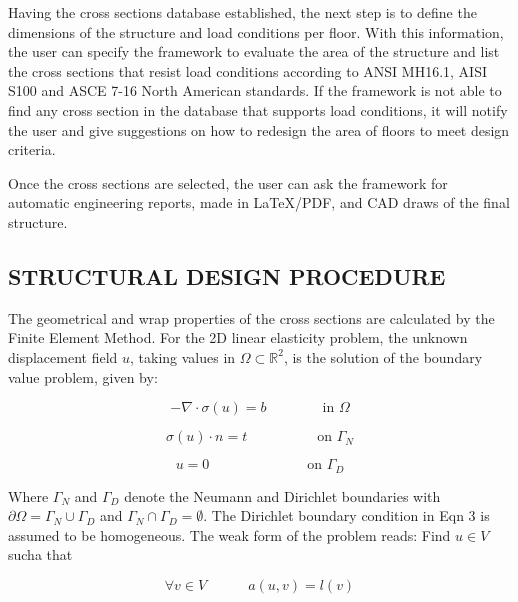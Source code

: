 \documentclass[twocolumn,10pt]{asme2e}
\begin{document}
Having the cross sections database established, the next step is to define the dimensions of the structure and load conditions per floor. With this information, the user can specify the framework to evaluate the area of the structure and list the cross sections that resist load conditions according to ANSI MH16.1, AISI S100 and ASCE 7-16 North American standards. If the framework is not able to find any cross section in the database that supports load conditions, it will notify the user and give suggestions on how to redesign the area of floors to meet design criteria. 

Once the cross sections are selected, the user can ask the framework for automatic engineering reports, made in LaTeX/PDF, and CAD draws of the final structure.


\subsection*{STRUCTURAL DESIGN PROCEDURE}

The geometrical and wrap properties of the cross sections are calculated by the Finite Element Method. For the 2D linear elasticity problem, the unknown displacement field $u$, taking values in $\Omega \subset \mathbb{R} ^2$, is the solution of the boundary value problem, given by:

\begin{equation}
- \nabla \cdot \sigma (u) = b \quad \quad \quad \quad  \text{in } \Omega
\end{equation}

\begin{equation}
\sigma (u) \cdot n = t \quad \quad \quad \quad \quad  \text{on } \Gamma _N
\end{equation}

\begin{equation}
u = 0 \quad \quad \quad \quad \quad \quad \quad \text{on } \Gamma _D
\end{equation}


Where $\Gamma _N$ and $\Gamma _D$ denote the Neumann and Dirichlet boundaries with $\partial \Omega = \Gamma _N \cup \Gamma _D$  and $\Gamma _N \cap \Gamma _D = \emptyset$. The Dirichlet boundary condition in Eqn 3 is assumed to be homogeneous. The weak form of the problem reads: Find $u \in V$ sucha that

\begin{equation}
\forall v \in V \quad \quad \quad a (u,v) = l(v)
\end{equation}
\end{document}

